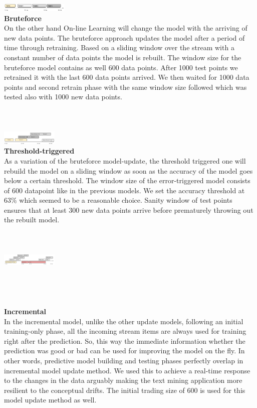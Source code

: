 \includegraphics[width=0.24\textwidth]{./time_models/OfflineModel.png}\\
\textbf{\large Bruteforce}\\
On the other hand On-line Learning will change the model with the arriving of new data points.
The bruteforce approach updates the model after a period of time through retraining. Based on a sliding window over the stream with a constant number of data points
the model is rebuilt. The window size for the bruteforce model contains as well 600 data points. After 1000 test points we retrained it with the last 600 data points arrived. We then waited for 1000 data points and second retrain phase with the same window size followed which was tested also with 1000 new data points.\\
\\
\\
\\
\includegraphics[width=0.2\textwidth]{./time_models/BruteforceModel}\\
\textbf{\large Threshold-triggered}\\
As a variation of the bruteforce model-update, the threshold triggered one will rebuild the model on a sliding window as soon as the accuracy of the model goes below a certain threshold. The window size of the error-triggered model consists of  600 datapoint like in the previous models. We set the accuracy threshold at 63\% which seemed to be a reasonable choice. Sanity window of test points ensures that at least 300 new data points arrive before prematurely throwing out the rebuilt model.\\
\\
\\
\\
\includegraphics[width=0.2\textwidth]{./time_models/Errortriggered}\\
\\
\\
\\
\\
\textbf{\large Incremental}\\
In the incremental model, unlike the other update models, following an initial training-only phase, all the incoming stream items are always used for training right after the prediction. So, this way the immediate information whether the prediction was good or bad can be used for improving the model on the fly. In other words, predictive model building and testing phases perfectly overlap in incremental model update method. We used this to achieve a real-time response to the changes in the data arguably making the text mining application more resilient to the conceptual drifts. The initial trading size of 600 is used for this model update method as well.

